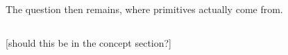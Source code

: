 













The question then remains, where primitives actually come from.
\subsection{}

\subsubsection{}
[should this be in the concept section?]

